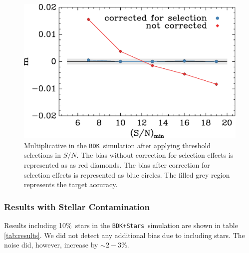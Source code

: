 \documentclass[a4paper,fleqn,usenatbib]{mnras}
\newcommand{\snr}{$S/N$}
\newcommand{\nsimNstarperc}{10\%}
\newcommand{\starnoiseincrease}{$\sim 2-3$\%}
\newcommand{\bdsim}{\texttt{BDK}}
\newcommand{\bdstar}{\texttt{BDK+Stars}}
\begin{document}
\begin{figure}
    \centering
    \includegraphics[width=\columnwidth]{mc-select-bias-thresh-with-nocorr.eps}

    \caption{Multiplicative in the \bdsim\ simulation after applying
        threshold selections in \snr.  The bias without correction for
        selection effects is represented as as red diamonds. The bias after
        correction for selection effects is represented as blue circles.  
        The filled grey region represents the target accuracy. } 

\label{fig:s2nthresh_nocorr}
\end{figure}







\subsubsection{Results with Stellar Contamination} \label{sec:stars}

Results including \nsimNstarperc\ stars in the \bdstar\ simulation are shown in
table \ref{tab:results}. We did not detect any additional bias due to including
stars. The noise did, however, increase by \starnoiseincrease.
\end{document}
